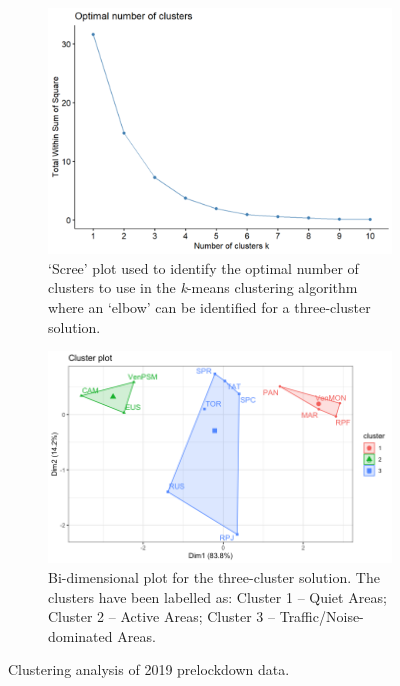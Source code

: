 \begin{figure}[!h]
  \centering
  \begin{subfigure}{.75\textwidth}
    \centering
    \includegraphics{Figures/NoiseMappingLockdown Fig 6.png}
    \caption{`Scree' plot used to identify the optimal number of clusters to use in the \emph{k}-means clustering algorithm where an `elbow' can be identified for a three-cluster solution. \label{fig:NsMapLockScree}}
  \end{subfigure}
\hfill
  \begin{subfigure}{.75\textwidth}
    \centering
    \includegraphics[width=\textwidth]{Figures/LockdownClusterAnalysis1_2022-04-29.png}
    \caption{Bi-dimensional plot for the three-cluster solution. The clusters have been labelled as: Cluster 1 -- Quiet Areas; Cluster 2 -- Active Areas; Cluster 3 -- Traffic/Noise-dominated Areas. \label{fig:NsMapLockBiplot}}
  \end{subfigure}

\caption{Clustering analysis of 2019 prelockdown data.}

\end{figure}

